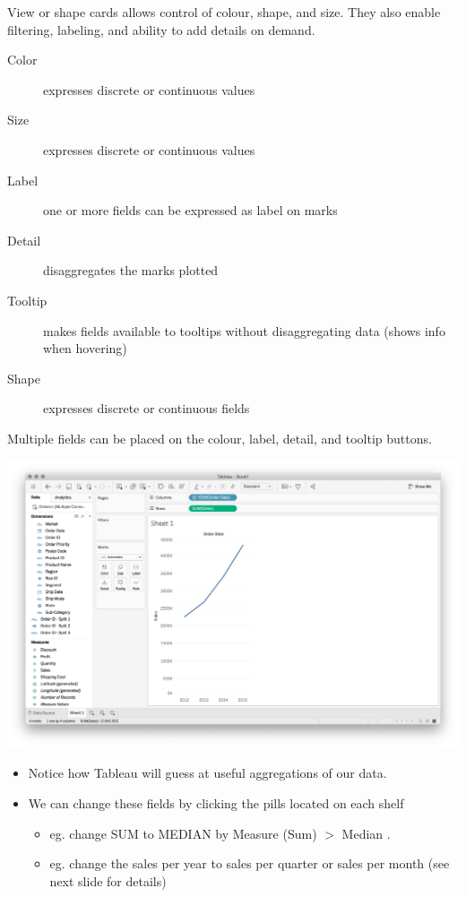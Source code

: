 \documentclass[xcolor=svgnames]{beamer} %
\begin{document}
\begin{frame}
View or shape cards allows control of colour, shape, and size. They also enable filtering, labeling, and ability to add details on demand.
\begin{description}
\item[Color] expresses discrete or continuous values
\item[Size] expresses discrete or continuous values
\item[Label] one or more fields can be expressed as label on marks
\item[Detail] disaggregates the marks plotted
\item[Tooltip] makes fields available to tooltips without disaggregating data (shows info when hovering)
\item [Shape]expresses discrete or continuous fields\vfill
\end{description}
Multiple fields can be placed on the colour, label, detail, and tooltip buttons.
\end{frame}



\begin{frame}
\begin{center}
\includegraphics[width=1.05\textwidth]{img/sales}
\end{center}
\end{frame}


\begin{frame}
\begin{itemize}
\item  Notice how Tableau will guess at useful aggregations of our data.  
\vfill
\item We can change these fields by clicking the pills located on each shelf 
\begin{itemize}
\item eg.  change SUM to MEDIAN by Measure (Sum) $>$ Median .
\item eg.  change the sales per year to sales per quarter or sales per month (see next slide for details)
\end{itemize}
\end{itemize}

\end{frame}
\end{document}
